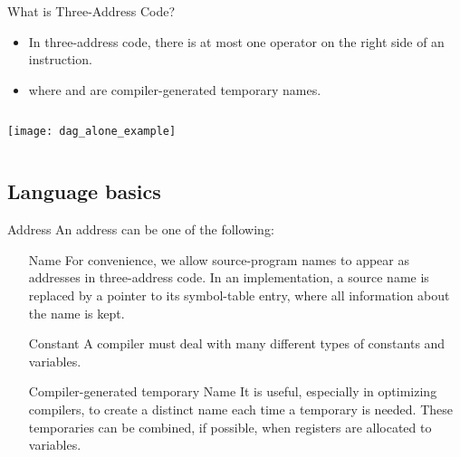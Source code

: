 \begin{bibunit}[apalike]
\begin{frame}{What is Three-Address Code?}
	\begin{itemize}
	\item In three-address code, there is at most one operator on the right side of an instruction.
		\begin{center}
			\begin{tac}[.3\linewidth]
			\end{tac}
		\end{center}
	\item where  and  are  compiler-generated temporary names.
	\end{itemize}
	\begin{columns}
		\begin{column}{.3\linewidth}
			\texttt{[image: dag\_alone\_example]}
		\end{column}
		\begin{column}{.5\linewidth}
			\begin{tac}[\linewidth]
			\end{tac}
		\end{column}
	\end{columns}
\end{frame}

\subsection{Language basics}

\begin{frame}{Address}
	An address can be one of the following:
	\begin{enumerate}
	\item[Name] For convenience, we allow source-program names to appear as addresses in three-address code. In an implementation, a source name is replaced by a pointer to its symbol-table entry, where all information about the name is kept.
	\vfill
	\item[Constant] A compiler must deal with many different types of constants and variables.
	\vfill
	\item[Compiler-generated temporary Name] It is useful, especially in optimizing compilers, to create a distinct name each time a temporary is needed. These temporaries can be combined, if possible, when registers are allocated to variables.
	\end{enumerate}
\end{frame}


\end{bibunit}

